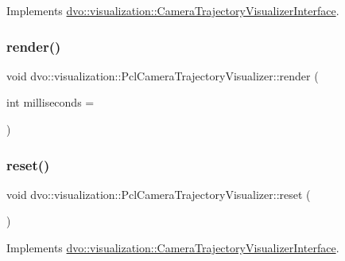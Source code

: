 Implements \mbox{\hyperlink{classdvo_1_1visualization_1_1_camera_trajectory_visualizer_interface_a4d43cd43f26bd880eb07e8ee37a7154a}{dvo\+::visualization\+::\+Camera\+Trajectory\+Visualizer\+Interface}}.

\mbox{\label{classdvo_1_1visualization_1_1_pcl_camera_trajectory_visualizer_a4d11076029980fdf3492da7eb304fe6a}} 
\subsubsection{\texorpdfstring{render()}{render()}}
{\footnotesize\ttfamily void dvo\+::visualization\+::\+Pcl\+Camera\+Trajectory\+Visualizer\+::render (\begin{DoxyParamCaption}\item[{int}]{milliseconds = {} }\end{DoxyParamCaption})}

\mbox{\label{classdvo_1_1visualization_1_1_pcl_camera_trajectory_visualizer_a1dd833071b1343a97c0366d3ced0799b}} 
\subsubsection{\texorpdfstring{reset()}{reset()}}
{\footnotesize\ttfamily void dvo\+::visualization\+::\+Pcl\+Camera\+Trajectory\+Visualizer\+::reset (\begin{DoxyParamCaption}{ }\end{DoxyParamCaption})\hspace{0.3cm}{\ttfamily [virtual]}}



Implements \mbox{\hyperlink{classdvo_1_1visualization_1_1_camera_trajectory_visualizer_interface_abcc7ddffc30b41eb9112c386f3e41aa7}{dvo\+::visualization\+::\+Camera\+Trajectory\+Visualizer\+Interface}}.

